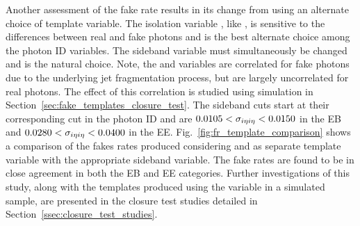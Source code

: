 Another assessment of the fake rate results in its change from using an alternate choice of template variable. The isolation variable \chiso, like \sieie, is sensitive to the differences between real and fake photons and is the best alternate choice among the photon ID variables. The sideband variable must simultaneously be changed and \sieie is the natural choice. Note, the \chiso and \sieie variables are correlated for fake photons due to the underlying jet fragmentation process, but are largely uncorrelated for real photons. The effect of this correlation is studied using simulation in Section~\ref{sec:fake_templates_closure_test}. The sideband cuts start at their corresponding cut in the photon ID and are $0.0105 < \sigma_{i\eta i\eta} < 0.0150$ in the EB and $0.0280 < \sigma_{i\eta i\eta} < 0.0400$ in the EE. Fig.~\ref{fig:fr_template_comparison} shows a comparison of the fakes rates produced considering \chiso and \sieie as separate template variable with the appropriate sideband variable. The fake rates are found to be in close agreement in both the EB and EE categories. Further investigations of this study, along with the templates produced using the \chiso variable in a simulated sample, are presented in the closure test studies detailed in Section~\ref{ssec:closure_test_studies}.

